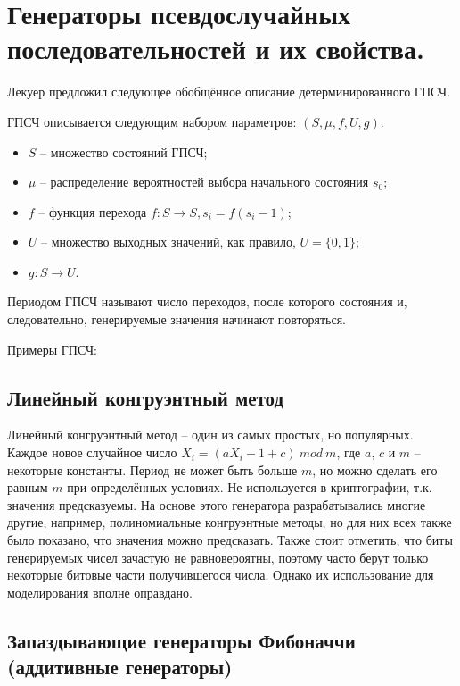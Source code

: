 \section{Генераторы псевдослучайных последовательностей и их свойства.}

Лекуер предложил следующее обобщённое описание детерминированного ГПСЧ.

ГПСЧ описывается следующим набором параметров: $(S, \mu, f, U, g)$.

\begin{itemize}
	\item $S$ -- множество состояний ГПСЧ;
	
	\item $\mu$ -- распределение вероятностей выбора начального состояния $s_0$;
	
	\item $f$ -- функция перехода $f: S \rightarrow S, s_i = f(s_i - 1)$;
	
	\item $U$ -- множество выходных значений, как правило, $U = \{0, 1\}$;
	
	\item $g: S \rightarrow U$.
\end{itemize}

Периодом ГПСЧ называют число переходов, после которого состояния и, следовательно, генерируемые значения начинают повторяться.

Примеры ГПСЧ:

\subsection{Линейный конгруэнтный метод}

Линейный конгруэнтный метод -- один из самых простых, но популярных. Каждое новое случайное число $X_i = (aX_i - 1 + c)\ mod\ m$, где $a$, $c$ и $m$ -- некоторые константы. Период не может быть больше $m$, но можно сделать его равным $m$ при определённых условиях.  Не используется в криптографии, т.к. значения предсказуемы. На основе этого генератора разрабатывались многие другие, например, полиномиальные конгруэнтные методы, но для них всех также было показано, что значения можно предсказать. Также стоит отметить, что биты генерируемых чисел зачастую не равновероятны, поэтому часто берут только некоторые битовые части получившегося числа. Однако их использование для моделирования вполне оправдано.

\subsection{Запаздывающие генераторы Фибоначчи (аддитивные генераторы)}

